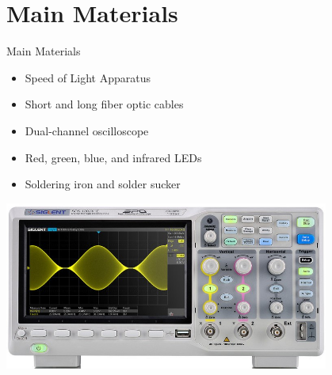 \documentclass{beamer}
\begin{document}
\section{Main Materials}
\begin{frame}{Main Materials}
  \begin{itemize}
    \item Speed of Light Apparatus
    \item Short and long fiber optic cables
    \item Dual-channel oscilloscope
    \item Red, green, blue, and infrared LEDs
    \item Soldering iron and solder sucker
  \end{itemize}
  \begin{center}
    \includegraphics[width=0.8\textwidth]{oscilloscope.jpg}
  \end{center}
\end{frame}

\end{document}
